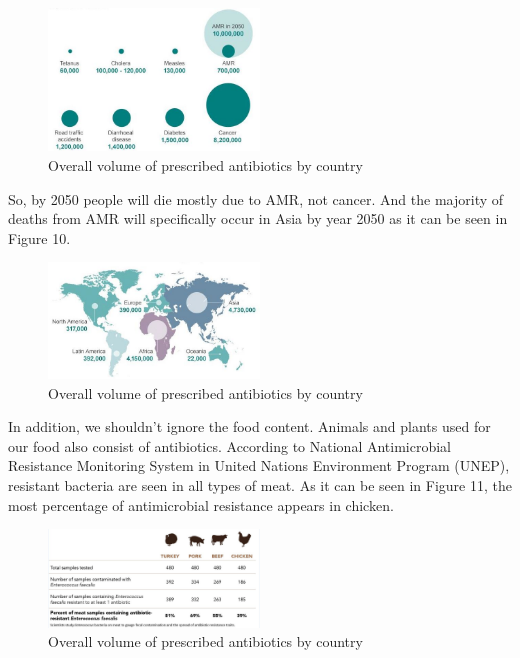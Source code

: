 \begin{figure}[H]
  \centering
  \includegraphics[width=0.5\textwidth]{img/Fig9}
  \caption{Overall volume of prescribed antibiotics by country}
  \label{fig9}
\end{figure}

So, by 2050 people will die mostly due to AMR, not cancer. And the majority of deaths from AMR will specifically occur in Asia by year 2050 as it can be seen in Figure 10.

\begin{figure}[H]
  \centering
  \includegraphics[width=0.5\textwidth]{img/Fig10}
  \caption{Overall volume of prescribed antibiotics by country}
  \label{fig10}
\end{figure}

In addition, we shouldn’t ignore the food content. Animals and plants used for our food also consist of antibiotics. According to National Antimicrobial Resistance Monitoring System in United Nations Environment Program (UNEP), resistant bacteria are seen in all types of meat. As it can be seen in Figure 11, the most percentage of antimicrobial resistance appears in chicken.

\begin{figure}[H]
  \centering
  \includegraphics[width=0.5\textwidth]{img/Fig11}
  \caption{Overall volume of prescribed antibiotics by country}
  \label{fig11}
\end{figure}

